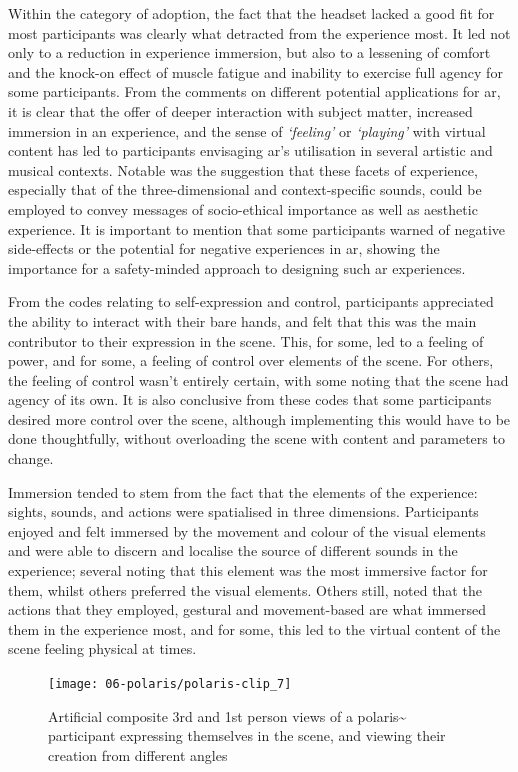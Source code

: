 Within the category of adoption, the fact that the headset lacked a good fit for most participants was clearly what detracted from the experience most. It led not only to a reduction in experience immersion, but also to a lessening of comfort and the knock-on effect of muscle fatigue and inability to exercise full agency for some participants. From the comments on different potential applications for \gls{ar}, it is clear that the offer of deeper interaction with subject matter, increased immersion in an experience, and the sense of \textit{`feeling'} or \textit{`playing'} with virtual content has led to participants envisaging \gls{ar}'s utilisation in several artistic and musical contexts. Notable was the suggestion that these facets of experience, especially that of the three-dimensional and context-specific sounds, could be employed to convey messages of socio-ethical importance as well as aesthetic experience. It is important to mention that some participants warned of negative side-effects or the potential for negative experiences in \gls{ar}, showing the importance for a safety-minded approach to designing such \gls{ar} experiences.

From the codes relating to self-expression and control, participants appreciated the ability to interact with their bare hands, and felt that this was the main contributor to their expression in the scene. This, for some, led to a feeling of power, and for some, a feeling of control over elements of the scene. For others, the feeling of control wasn't entirely certain, with some noting that the scene had agency of its own. It is also conclusive from these codes that some participants desired more control over the scene, although implementing this would have to be done thoughtfully, without overloading the scene with content and parameters to change.

Immersion tended to stem from the fact that the elements of the experience: sights, sounds, and actions were spatialised in three dimensions. Participants enjoyed and felt immersed by the movement and colour of the visual elements and were able to discern and localise the source of different sounds in the experience; several noting that this element was the most immersive factor for them, whilst others preferred the visual elements. Others still, noted that the actions that they employed, gestural and movement-based are what immersed them in the experience most, and for some, this led to the virtual content of the scene feeling physical at times.

\begin{figure}[ht]
    \centering
    \texttt{[image: 06-polaris/polaris-clip\_7]}
    \captionsetup{justification=centering,margin=1.5cm}
    \caption{Artificial composite 3rd and 1st person views of a polaris\textasciitilde{} participant expressing themselves in the scene, and viewing their creation from different angles \citep[from][\href{https://youtu.be/H8d3n7eNKAg}{at 0:00}]{bilbow2022}}\label{fig: polaris-clip_7}
\end{figure}

